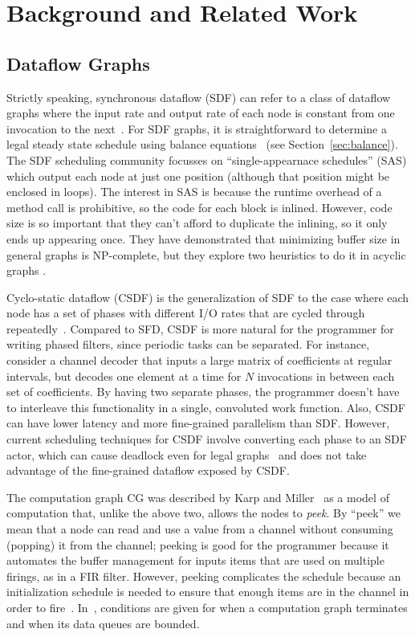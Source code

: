 \section{Background and Related Work}
\label{sec:related}

\subsection{Dataflow Graphs}

Strictly speaking, synchronous dataflow (SDF) can refer to a class of
dataflow graphs where the input rate and output rate of each node is
constant from one invocation to the next~\cite{LM87-i,LM87-ii}.  For
SDF graphs, it is straightforward to determine a legal steady state
schedule using balance equations~\cite{leesdf} (see
Section~\ref{sec:balance}).  The SDF scheduling community focusses on
``single-appearnace schedules'' (SAS) which output each node at just
one position (although that position might be enclosed in loops).  The
interest in SAS is because the runtime overhead of a method call is
prohibitive, so the code for each block is inlined.  However, code
size is so important that they can't afford to duplicate the inlining,
so it only ends up appearing once.  They have demonstrated that
minimizing buffer size in general graphs is NP-complete, but they
explore two heuristics to do it in acyclic graphs \cite{Bhatta97}.

Cyclo-static dataflow (CSDF) is the generalization of SDF to the case
where each node has a set of phases with different I/O rates that are
cycled through repeatedly~\cite{BELP96,Parks95}.  Compared to SFD,
CSDF is more natural for the programmer for writing phased filters,
since periodic tasks can be separated.  For instance, consider a
channel decoder that inputs a large matrix of coefficients at regular
intervals, but decodes one element at a time for $N$ invocations in
between each set of coefficients.  By having two separate phases, the
programmer doesn't have to interleave this functionality in a single,
convoluted work function.  Also, CSDF can have lower latency and more
fine-grained parallelism than SDF.  However, current scheduling
techniques for CSDF involve converting each phase to an SDF actor,
which can cause deadlock even for legal graphs~\cite{BELP96} and does
not take advantage of the fine-grained dataflow exposed by CSDF.

The computation graph {CG} was described by Karp and
Miller~\cite{Karp67} as a model of computation that, unlike the above
two, allows the nodes to {\it peek}.  By ``peek'' we mean that a node
can read and use a value from a channel without consuming (popping) it
from the channel; peeking is good for the programmer because it
automates the buffer management for inputs items that are used on
multiple firings, as in a FIR filter.  However, peeking complicates
the schedule because an initialization schedule is needed to ensure
that enough items are in the channel in order to fire~\cite{Gordo02}.
In~\cite{Karp67}, conditions are given for when a computation graph
terminates and when its data queues are bounded.

